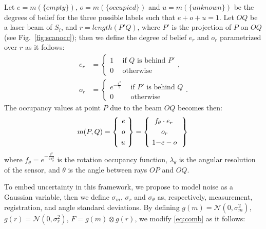 Let  $e = m(\{empty\})$, $o = m(\{occupied\})$ and $u = m(\{unknown\})$ be the degrees of belief for the three possible labels such that $e + o + u = 1$. 
Let $OQ$ be a laser beam of $S_i$, and $r = length(P'Q)$, where $P'$ is the projection of $P$ on $OQ$ (see Fig.~\ref{fig:scanocc}); then we define the degree of belief $e_r$ and $o_r$ parametrized over $r$ as it follows:
\begin{align}
\label{eq:occ}
 e_r &=  \begin{cases}
               1 \ \ & \text{if $Q$ is behind $P'$}\\
               0 \ \ & \text{otherwise}
         \end{cases},\\
\label{eq:occ_2}
o_r &=  \begin{cases}
      e^{-\frac{r^2}{2}} \ \ & \text{if $P'$ is behind $Q$}\\
      0 \ \ & \text{otherwise}
        \end{cases}.
\end{align}
The occupancy values at point $P$ due to the beam $OQ$ becomes then:
\begin{equation}
\label{eq:comb}
 m(P,Q)=\left\{\  \begin{aligned}
                 e\\o\\u
                 \end{aligned}
\  \right\} = \left\{\  \begin{aligned}
                     f_\theta&\cdot e_r \ \\
                     &o_r \ \\
                     1 - &e - o \ 
                    \end{aligned}
\ \right\}\\
\end{equation}
where $f_\theta = e^{-\frac{\theta^2}{2\lambda_\theta^2}}$ is the rotation occupancy function, $\lambda_\theta$ is the angular resolution of the sensor, and $\theta$ is the angle between rays $OP$ and $OQ$.

To embed uncertainty in this framework, we propose to model noise as a Gaussian variable, then we define $\sigma_m$, $\sigma_r$ and $\sigma_\theta$ as, respectively, measurement, registration, and angle standard deviations. 
By defining  $g(m) = \mathcal{N}(0, \sigma_m^2)$, $g(r) = \mathcal{N}(0, \sigma_r^2)$, $F = g(m)\otimes g(r)$, we modify \eqref{eq:comb} as it follows:

